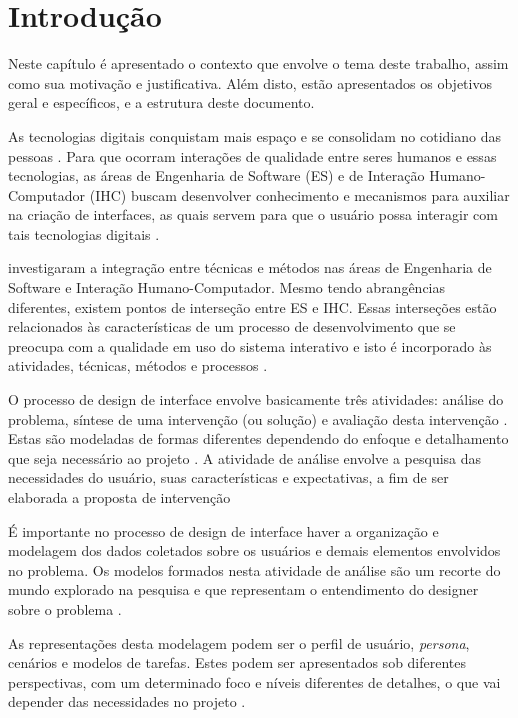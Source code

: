 \chapter{Introdução}
\label{chap:intro}

Neste capítulo é apresentado o contexto que envolve o tema deste trabalho, assim como sua motivação e justificativa. Além disto, estão apresentados os objetivos geral e específicos, e a estrutura deste documento. 

As tecnologias digitais conquistam mais espaço e se consolidam no cotidiano das pessoas \cite{Sales2020}. Para que ocorram interações de qualidade entre seres humanos e essas tecnologias, as áreas de Engenharia de Software (ES) e de Interação Humano-Computador (IHC) buscam desenvolver conhecimento e mecanismos para auxiliar na criação de interfaces, as quais servem para que o usuário possa interagir com tais tecnologias digitais \cite[p. 3, 8-10]{BarbosaEtAl2021}.  

 investigaram a integração entre técnicas e métodos nas áreas de Engenharia de Software e Interação Humano-Computador. Mesmo tendo abrangências diferentes, existem pontos de interseção entre ES e IHC. Essas interseções estão relacionados às características de um processo de desenvolvimento que se preocupa com a qualidade em uso do sistema interativo e isto é incorporado às atividades, técnicas, métodos e processos \cite[p. 114-115]{BarbosaEtAl2021}.

O processo de design de interface envolve basicamente três atividades: análise do problema, síntese de uma intervenção (ou solução) e avaliação desta intervenção \cite{lawson2006}. Estas são modeladas de formas diferentes dependendo do enfoque e detalhamento que seja necessário ao projeto \cite[p. 98-99]{BarbosaEtAl2021}. A atividade de análise envolve a pesquisa das necessidades do usuário, suas características e expectativas, a fim de ser elaborada a proposta de intervenção \cite[p. 121]{BarbosaEtAl2021}

É importante no processo de design de interface haver a organização e modelagem dos dados coletados sobre os usuários e demais elementos envolvidos no problema. Os modelos formados nesta atividade de análise são um recorte do mundo explorado na pesquisa e que representam o entendimento do designer sobre o problema \cite[p. 151]{BarbosaEtAl2021}. 

As representações desta modelagem podem ser o perfil de usuário, \textit{persona}, cenários e modelos de tarefas. Estes podem ser apresentados sob diferentes perspectivas, com um determinado foco e níveis diferentes de detalhes, o que vai depender das necessidades no projeto \cite[p. 151]{BarbosaEtAl2021}.

